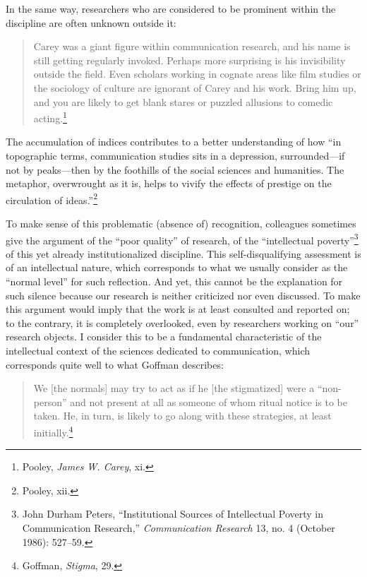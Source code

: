 \documentclass{tufte-handout}
\begin{document}
\noindent In the same way, researchers who are considered to be prominent within
the discipline are often unknown outside it:

\begin{quote}
Carey was a giant figure within communication research, and his name is
still getting regularly invoked. Perhaps more surprising is his
invisibility outside the field. Even scholars working in cognate areas
like film studies or the sociology of culture are ignorant of Carey and
his work. Bring him up, and you are likely to get blank stares or
puzzled allusions to comedic acting.\footnote{Pooley, \emph{James W.
  Carey}, xi.}
\end{quote}

\noindent The accumulation of indices contributes to a better understanding of how
``in topographic terms, communication studies sits in a depression,
surrounded---if not by peaks---then by the foothills of the social
sciences and humanities. The metaphor, overwrought as it is, helps to
vivify the effects of prestige on the circulation of ideas.''\footnote{Pooley,
  xii.}

To make sense of this problematic (absence of) recognition, colleagues
sometimes give the argument of the ``poor quality'' of research, of the
``intellectual poverty''\footnote{John Durham Peters, ``Institutional
  Sources of Intellectual Poverty in Communication Research,''
  \emph{Communication Research} 13, no. 4 (October 1986): 527--59.} of
this yet already institutionalized discipline. This self-disqualifying
assessment is of an intellectual nature, which corresponds to what we
usually consider as the ``normal level'' for such reflection. And yet,
this cannot be the explanation for such silence because our research is
neither criticized nor even discussed. To make this argument would imply
that the work is at least consulted and reported on; to the contrary, it
is completely overlooked, even by researchers working on ``our''
research objects. I consider this to be a fundamental characteristic of
the intellectual context of the sciences dedicated to communication,
which corresponds quite well to what Goffman describes:

\begin{quote}
We {[}the normals{]} may try to act as if he {[}the stigmatized{]} were
a ``non-person'' and not present at all as someone of whom ritual notice
is to be taken. He, in turn, is likely to go along with these
strategies, at least initially.\footnote{Goffman, \emph{Stigma}, 29.}
\end{quote}
\end{document}
